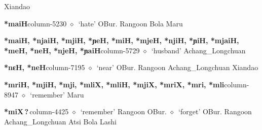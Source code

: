 \hspace{1ex}
         Xiandao 
  \item {\footnotesize \textbf{*maiH}}{\tiny column-5230}
         $\diamond$~`hate'
         OBur. 
\hspace{1ex}
         Rangoon 
\hspace{1ex}
         Bola 
\hspace{1ex}
         Maru 
  \item {\footnotesize \textbf{*maiH, *njaiH, *mjiH, *ɲeH, *miH, *mjeH, *njiH, *ɲiH, *mjaiH, *meH, *neH, *njeH, *ɲaiH}}{\tiny column-5729}
         $\diamond$~`husband'
         Achang\_Longchuan 
  \item {\footnotesize \textbf{*nɛH, *neH}}{\tiny column-7195}
         $\diamond$~`near'
         OBur. 
\hspace{1ex}
         Rangoon 
\hspace{1ex}
         Achang\_Longchuan 
\hspace{1ex}
         Xiandao 
  \item {\footnotesize \textbf{*mriH, *mjiH, *mji, *mliX, *mliH, *mjiX, *mriX, *mri, *mli}}{\tiny column-8947}
         $\diamond$~`remember'
         Maru 
  \item {\footnotesize \textbf{*miX\,?\,}}{\tiny column-4425}
         $\diamond$~`remember'
         Rangoon 
\hspace{1ex}
         OBur. 
\hspace{1ex}
         $\diamond$~`forget'
         OBur. 
\hspace{1ex}
         Rangoon 
\hspace{1ex}
         Achang\_Longchuan 
\hspace{1ex}
         Atsi 
\hspace{1ex}
         Bola 
\hspace{1ex}
         Lashi 
\hspace{1ex}
